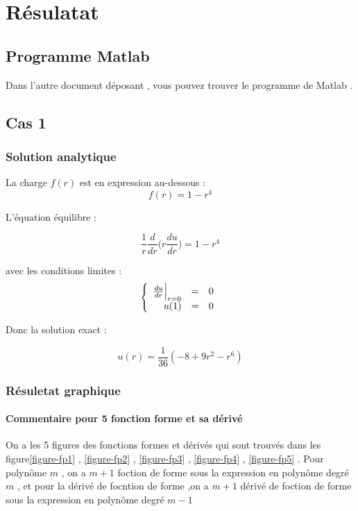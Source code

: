 \documentclass[a4paper,10pt]{report} %
\begin{document}
\chapter{Résulatat}
\section{Programme Matlab}
Dans l'autre document déposant , vous pouvez trouver le programme de Matlab .
\section{Cas 1 }
\subsection{Solution analytique}
 La charge $f(r)$ est en expression au-dessous :
 \begin{equation}
 f(r)=1-r^4
 \end{equation}
 
 L'équation équilibre :
 
\begin{equation}
\frac{1}{r}\frac{d}{dr}\Big(r\frac{du}{dr}\Big)=1-r^4
\end{equation}

avec les conditions limites :
$$
\left\{
\begin{array}{r c l}
\frac{du}{dr}\Big|_{r=0}&=&0\\u(1)&=&0
\end{array}
\right.
$$

 Donc la solution exact :
 
 $$u(r) = \frac{1}{36}(-8 + 9r^2 - r^6)$$
 
\subsection{Résuletat graphique}


\subsubsection{Commentaire pour 5 fonction forme et sa dérivé} 
On a les 5 figures des fonctions formes et dérivés qui sont trouvés dans les figure\ref{figure-fp1} , \ref{figure-fp2} , \ref{figure-fp3} , \ref{figure-fp4} , \ref{figure-fp5} . Pour polynôme $m$ , on a $m+1$ foction de forme sous la expression en polynôme degré $m$ , et pour la dérivé de focntion de forme ,on a $m+1$ dérivé de foction de forme sous la expression en polynôme degré $m-1$
\end{document}
